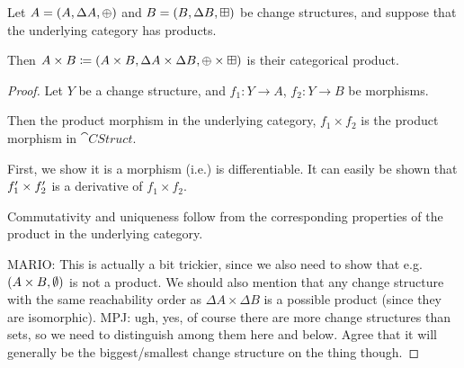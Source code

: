 \begin{prop}[Products]
  Let $A = (A,\Delta A,\oplus)$ and $B =
  (B,\Delta B,\boxplus)$ be change structures, and suppose that the
  underlying category has products.

  Then $A \times B \coloneqq (A \times B,\Delta A \times
  \Delta B,\oplus \times \boxplus)$ is their categorical product.
\end{prop}
\begin{proof}
  Let $Y$ be a change structure, and $f_1: Y \rightarrow A$, $f_2: Y
  \rightarrow B$ be morphisms.

  Then the product morphism in the underlying category, $f_1 \times f_2$ is the product
  morphism in $\cat{CStruct}$.

  First, we show it is a morphism (i.e.) is differentiable. It can easily be
  shown that $f_1' \times f_2'$ is a derivative of $f_1 \times f_2$.

  Commutativity and uniqueness follow from the corresponding properties of the
  product in the underlying category.

  MARIO: This is actually a bit trickier, since we also need to show that e.g. 
  $(A \times B, \emptyset)$ is not a product. We should also mention that any change
  structure with the same reachability order as $\Delta A \times \Delta B$ is a possible
  product (since they are isomorphic).
  MPJ: ugh, yes, of course there are more change structures than sets, so
  we need to distinguish among them here and below. Agree that it will generally
  be the biggest/smallest change structure on the thing though.
\end{proof}

